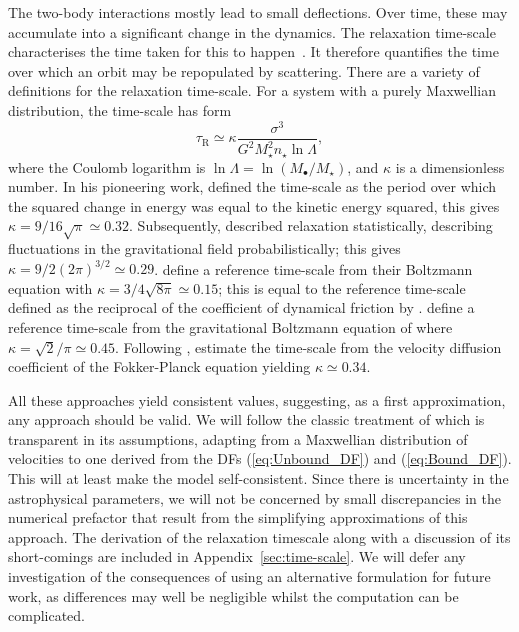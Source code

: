 \documentclass[useAMS,usedcolumn,usegraphicx,usenatbib]{mn2e}
\newcommand{\eqnref}[1]{(\ref{eq:#1})}
\newcommand{\apref}[1]{Appendix~\ref{sec:#1}}
\newcommand{\sub}[1]{\ensuremath{_\mathrm{#1}}}
\begin{document}
The two-body interactions mostly lead to small deflections. Over time, these may accumulate into a significant change in the dynamics. The relaxation time-scale characterises the time taken for this to happen~\citep{Binney1987}. It therefore quantifies the time over which an orbit may be repopulated by scattering. There are a variety of definitions for the relaxation time-scale. For a system with a purely Maxwellian distribution, the time-scale has form
\begin{equation}
\tau\sub{R} \simeq \kappa\frac{\sigma^3}{G^2M_\star^2 n_\star\ln\Lambda},
\end{equation}
where the Coulomb logarithm is $\ln\Lambda = \ln(M_\bullet/M_\star)$, and $\kappa$ is a dimensionless number. In his pioneering work, \citet{Chandrasekhar1941, Chandrasekhar1960} defined the time-scale as the period over which the squared change in energy was equal to the kinetic energy squared, this gives $\kappa = 9/16\sqrt{\pi} \simeq 0.32$. Subsequently, \citet{Chandrasekhar1941a} described relaxation statistically, describing fluctuations in the gravitational field probabilistically; this gives $\kappa = 9/2(2\pi)^{3/2} \simeq 0.29$. \citet{Bahcall1977} define a reference time-scale from their Boltzmann equation with $\kappa = 3/4\sqrt{8\pi} \simeq 0.15$; this is equal to the reference time-scale defined as the reciprocal of the coefficient of dynamical friction by \citet{Chandrasekhar1943a, Chandrasekhar1943}. \citet{Spitzer1958} define a reference time-scale from the gravitational Boltzmann equation of \citet{Spitzer1951} where $\kappa = \sqrt{2}/\pi \simeq 0.45$. Following \citet{Spitzer1971}, \citet[section 8.3.4]{Binney1987} estimate the time-scale from the velocity diffusion coefficient of the Fokker-Planck equation yielding $\kappa \simeq 0.34$.

All these approaches yield consistent values, suggesting, as a first approximation, any approach should be valid. We will follow the classic treatment of \citet[chapter 2]{Chandrasekhar1960} which is transparent in its assumptions, adapting from a Maxwellian distribution of velocities to one derived from the DFs \eqnref{Unbound_DF} and \eqnref{Bound_DF}. This will at least make the model self-consistent. Since there is uncertainty in the astrophysical parameters, we will not be concerned by small discrepancies in the numerical prefactor that result from the simplifying approximations of this approach. The derivation of the relaxation timescale along with a discussion of its short-comings are included in \apref{time-scale}. We will defer any investigation of the consequences of using an alternative formulation for future work, as differences may well be negligible whilst the computation can be complicated.
\end{document}
